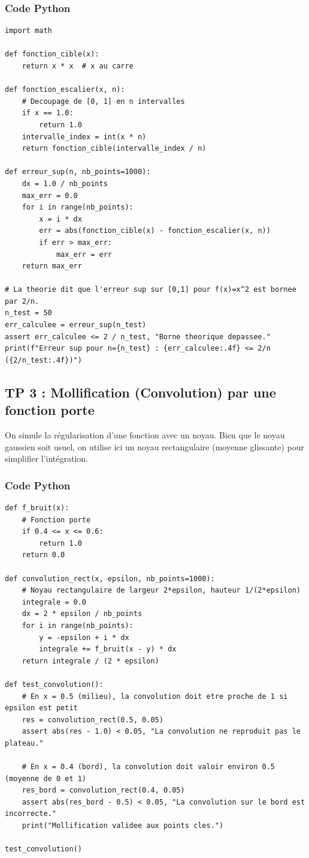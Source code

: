 \documentclass[11pt,a4paper]{article}
\begin{document}
\subsubsection*{Code Python}

\begin{lstlisting}
import math

def fonction_cible(x):
    return x * x  # x au carre

def fonction_escalier(x, n):
    # Decoupage de [0, 1] en n intervalles
    if x == 1.0:
        return 1.0
    intervalle_index = int(x * n)
    return fonction_cible(intervalle_index / n)

def erreur_sup(n, nb_points=1000):
    dx = 1.0 / nb_points
    max_err = 0.0
    for i in range(nb_points):
        x = i * dx
        err = abs(fonction_cible(x) - fonction_escalier(x, n))
        if err > max_err:
            max_err = err
    return max_err

# La theorie dit que l'erreur sup sur [0,1] pour f(x)=x^2 est bornee par 2/n.
n_test = 50
err_calculee = erreur_sup(n_test)
assert err_calculee <= 2 / n_test, "Borne theorique depassee."
print(f"Erreur sup pour n={n_test} : {err_calculee:.4f} <= 2/n ({2/n_test:.4f})")
\end{lstlisting}


\subsection*{TP 3 : Mollification (Convolution) par une fonction porte}

On simule la régularisation d'une fonction avec un noyau. Bien que le noyau gaussien soit usuel, on utilise ici un noyau rectangulaire (moyenne glissante) pour simplifier l'intégration.

\subsubsection*{Code Python}

\begin{lstlisting}
def f_bruit(x):
    # Fonction porte
    if 0.4 <= x <= 0.6:
        return 1.0
    return 0.0

def convolution_rect(x, epsilon, nb_points=1000):
    # Noyau rectangulaire de largeur 2*epsilon, hauteur 1/(2*epsilon)
    integrale = 0.0
    dx = 2 * epsilon / nb_points
    for i in range(nb_points):
        y = -epsilon + i * dx
        integrale += f_bruit(x - y) * dx
    return integrale / (2 * epsilon)

def test_convolution():
    # En x = 0.5 (milieu), la convolution doit etre proche de 1 si epsilon est petit
    res = convolution_rect(0.5, 0.05)
    assert abs(res - 1.0) < 0.05, "La convolution ne reproduit pas le plateau."

    # En x = 0.4 (bord), la convolution doit valoir environ 0.5 (moyenne de 0 et 1)
    res_bord = convolution_rect(0.4, 0.05)
    assert abs(res_bord - 0.5) < 0.05, "La convolution sur le bord est incorrecte."
    print("Mollification validee aux points cles.")

test_convolution()
\end{lstlisting}
\end{document}
